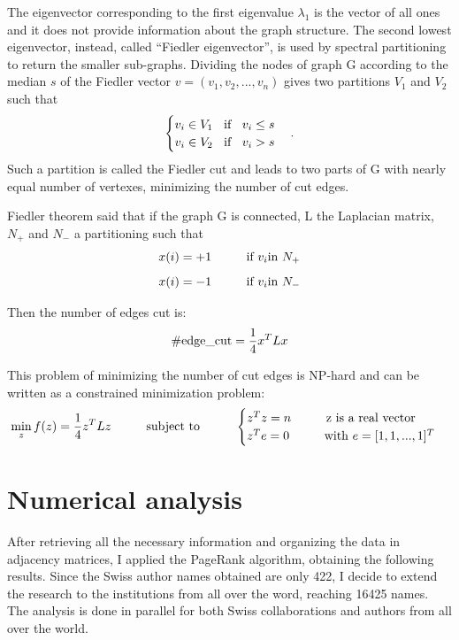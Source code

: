\documentclass[]{usiinfbachelorproject}
\newcommand\tab[1][1cm]{\hspace*{#1}}
\begin{document}
The eigenvector corresponding to the first eigenvalue $\lambda_1$ is the vector of all ones and it does not provide information about the graph structure. The second lowest eigenvector, instead, called ``Fiedler eigenvector'', is used by spectral partitioning to return the smaller sub-graphs. Dividing the nodes of graph G according to the median $s$ of the Fiedler vector $v = (v_1,v_2,...,v_n)$ gives two partitions $V_1$ and $V_2$ such that
\begin{equation}\notag
\begin{cases}
v_i \in V_1 \text{\;\; if \;\;} v_i \leq s \\
v_i \in V_2 \text{\;\; if \;\;} v_i > s
\end{cases} .
\end{equation}
Such a partition is called the Fiedler cut and leads to two parts of G with nearly equal number of vertexes, minimizing the number of cut edges. 

Fiedler theorem said that if the graph G is connected, L the Laplacian matrix, $N_+$ and $N_-$ a partitioning such that
\begin{equation}\notag
x(i) = +1 \tab \text{if } v_i \text{in } N_+ 
\end{equation}
\begin{equation}\notag
x(i) = -1 \tab \text{if } v_i \text{in } N_-
\end{equation}

Then the number of edges cut is:
\begin{equation}\notag
\#\text{edge\_cut} = \frac{1}{4}x^T L x
\end{equation}

This problem of minimizing the number of cut edges is NP-hard and can be written as a constrained minimization problem:
\begin{equation}\notag
\min\limits_z f(z)=\frac{1}{4} z^T L z \tab \text{subject to} \tab 
\begin{cases}
z^T z = n \tab \text{z is a real vector}\\
z^T e = 0 \tab \text{with } e=[1,1,...,1]^T
\end{cases}
\end{equation}








\section{Numerical analysis}
After retrieving all the necessary information and organizing the data in adjacency matrices, I applied the PageRank algorithm, obtaining the following results.
Since the Swiss author names obtained are only 422, I decide to extend the research to the institutions from all over the word, reaching 16425 names. The analysis is done in parallel for both Swiss collaborations and authors from all over the world.
\end{document}
